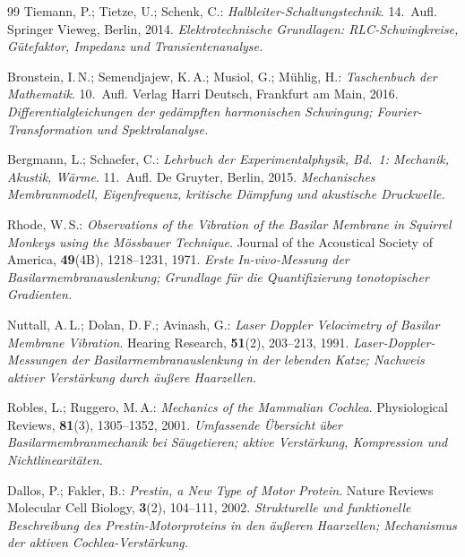 ﻿\documentclass[12pt,a4paper,titlepage]{report}
\begin{document}
\begin{thebibliography}{99}
Tiemann, P.; Tietze, U.; Schenk, C.:
\textit{Halbleiter-Schaltungstechnik}. 14.~Aufl.
Springer Vieweg, Berlin, 2014.
\newline\textit{Elektrotechnische Grundlagen: RLC-Schwingkreise, Gütefaktor,
Impedanz und Transientenanalyse.}

Bronstein, I.\,N.; Semendjajew, K.\,A.; Musiol, G.; Mühlig, H.:
\textit{Taschenbuch der Mathematik}. 10.~Aufl.
Verlag Harri Deutsch, Frankfurt am Main, 2016.
\newline\textit{Differentialgleichungen der gedämpften harmonischen Schwingung;
Fourier-Transformation und Spektralanalyse.}

Bergmann, L.; Schaefer, C.:
\textit{Lehrbuch der Experimentalphysik, Bd.~1: Mechanik, Akustik, Wärme}.
11.~Aufl. De Gruyter, Berlin, 2015.
\newline\textit{Mechanisches Membranmodell, Eigenfrequenz, kritische Dämpfung
und akustische Druckwelle.}

Rhode, W.\,S.:
\textit{Observations of the Vibration of the Basilar Membrane in Squirrel
Monkeys using the Mössbauer Technique}.
Journal of the Acoustical Society of America, \textbf{49}(4B), 1218--1231, 1971.
\newline\textit{Erste In-vivo-Messung der Basilarmembranauslenkung; Grundlage für
die Quantifizierung tonotopischer Gradienten.}

Nuttall, A.\,L.; Dolan, D.\,F.; Avinash, G.:
\textit{Laser Doppler Velocimetry of Basilar Membrane Vibration}.
Hearing Research, \textbf{51}(2), 203--213, 1991.
\newline\textit{Laser-Doppler-Messungen der Basilarmembranauslenkung in der
lebenden Katze; Nachweis aktiver Verstärkung durch äußere Haarzellen.}

Robles, L.; Ruggero, M.\,A.:
\textit{Mechanics of the Mammalian Cochlea}.
Physiological Reviews, \textbf{81}(3), 1305--1352, 2001.
\newline\textit{Umfassende Übersicht über Basilarmembranmechanik bei Säugetieren;
aktive Verstärkung, Kompression und Nichtlinearitäten.}

Dallos, P.; Fakler, B.:
\textit{Prestin, a New Type of Motor Protein}.
Nature Reviews Molecular Cell Biology, \textbf{3}(2), 104--111, 2002.
\newline\textit{Strukturelle und funktionelle Beschreibung des Prestin-Motorproteins
in den äußeren Haarzellen; Mechanismus der aktiven Cochlea-Verstärkung.}


\end{thebibliography}
\end{document}
